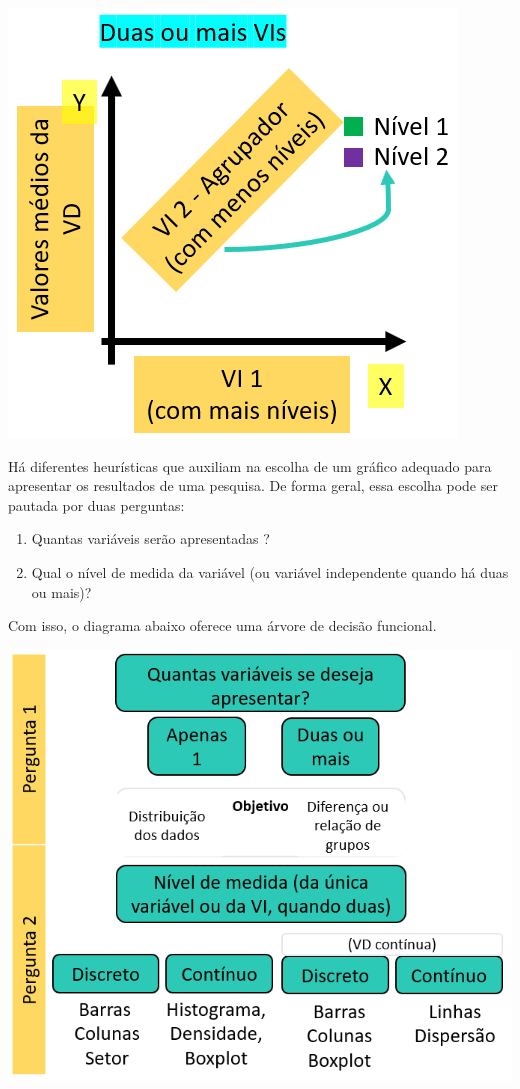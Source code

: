 \documentclass[
]{book}
\providecommand{\tightlist}{%
  \setlength{\itemsep}{0pt}\setlength{\parskip}{0pt}}
\begin{document}
\includegraphics{./img/cap_grafico_tutorial2.png}

Há diferentes heurísticas que auxiliam na escolha de um gráfico adequado para apresentar os resultados de uma pesquisa. De forma geral, essa escolha pode ser pautada por duas perguntas:

\begin{enumerate}
\def\labelenumi{\arabic{enumi}.}
\tightlist
\item
  Quantas variáveis serão apresentadas ?\\
\item
  Qual o nível de medida da variável (ou variável independente quando há duas ou mais)?
\end{enumerate}

Com isso, o diagrama abaixo oferece uma árvore de decisão funcional.

\includegraphics{./img/cap_como_fazer_graficos.png}
\end{document}
